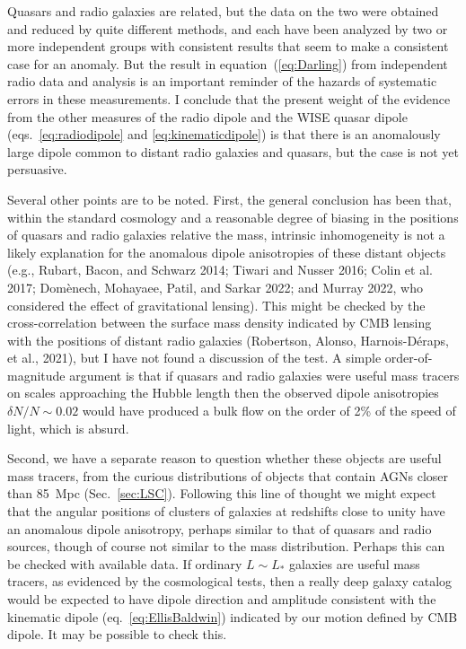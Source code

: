 \documentclass[fleqn,usenatbib]{mnras}
\begin{document}
Quasars and radio galaxies are related, but the data on the two were obtained and reduced by quite different methods, and each have been analyzed by two or more independent groups with consistent results that seem to make a consistent case for an anomaly. But the result in equation~(\ref{eq:Darling}) from independent radio data and analysis is an important reminder of the hazards of systematic errors in these measurements. I conclude that the present weight of the evidence from the other measures of the radio dipole and the WISE quasar dipole (eqs.~\ref{eq:radiodipole} and \ref{eq:kinematicdipole}) is that there is an anomalously large dipole common to distant radio galaxies and quasars, but the case is not yet persuasive. 

Several other points are to be noted. First, the general conclusion has been that, within the standard cosmology and a reasonable degree of biasing in the positions of quasars and radio galaxies relative the mass, intrinsic inhomogeneity is not a likely explanation for the anomalous dipole anisotropies of these distant objects  (e.g., Rubart, Bacon, and Schwarz 2014; Tiwari and Nusser 2016; Colin et al. 2017; Dom{\`e}nech, Mohayaee, Patil, and Sarkar 2022; and Murray 2022, who considered the effect of gravitational lensing). This might be checked by the cross-correlation between the surface mass density indicated by CMB lensing with the positions of distant radio galaxies (Robertson, Alonso, Harnois-D{\'e}raps, et al., 2021), but I have not found a discussion of the test. A simple order-of-magnitude argument is that if quasars and radio galaxies were useful mass tracers on scales approaching the Hubble length then the observed dipole anisotropies $\delta N/N\sim 0.02$ would have produced a bulk flow on the order of 2\% of the speed of light, which is absurd.

Second, we have a separate reason to question whether these objects are useful mass tracers, from the curious distributions of objects that contain AGNs closer than 85~Mpc (Sec.~\ref{sec:LSC}). Following this line of thought we might expect that the angular positions of clusters of galaxies at redshifts close to unity have an anomalous dipole anisotropy, perhaps similar to that of quasars and radio sources, though of course not similar to the mass distribution. Perhaps this can be checked with available data. If ordinary $L\sim L_\ast$ galaxies are useful mass tracers, as evidenced by the cosmological tests, then a really deep galaxy catalog would be expected to have dipole direction and amplitude consistent with the kinematic dipole (eq.~\ref{eq:EllisBaldwin}) indicated by our motion defined by CMB dipole. It may be possible to check this.
 
\end{document}
